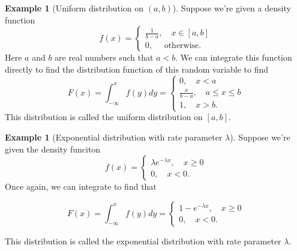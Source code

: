 \documentclass[12pt]{article}
\theoremstyle{definition}
\newtheorem{exmp}[thm]{Example}
\theoremstyle{remark}
\numberwithin{equation}{section}
\begin{document}
\begin{exmp}[Uniform distribution on $(a,b)$]
Suppose we're given a density function 
\begin{equation}
  f(x) = \begin{cases}
    \frac{1}{b-a}, \quad x\in[a,b] \\
    0, \quad \text{ otherwise.}
  \end{cases}
\end{equation}
Here $a$ and $b$ are real numbers such that $a<b$. We can integrate this function directly to find the distribution function of this random variable to find
\begin{equation}
  F(x) = \int_{-\infty}^{x} f(y)dy = \begin{cases}
    0, \quad x < a\\
    \frac{x}{b-a}, \quad a\leq x \leq b \\
    1, \quad x > b.
  \end{cases}
\end{equation}
This distribution is called the uniform distribution on $[a,b]$.
\end{exmp}

\begin{exmp}[Exponential distribution with rate parameter $\lambda$]
Suppose we're given the density funciton 
\begin{equation}
  f(x) = \begin{cases}
        \lambda e^{-\lambda x}, \quad x\geq 0\\
        0, \quad x < 0.
      \end{cases}
\end{equation}
Once again, we can integrate to find that 

\begin{equation}
  F(x)= \int_{-\infty}^{x}f(y)dy = \begin{cases}
        1 - e^{-\lambda x}, \quad x\geq 0\\
        0, \quad x < 0.
      \end{cases}
\end{equation}

This distribution is called the exponential distribution with rate parameter $\lambda$.
\end{exmp}

\end{document}
